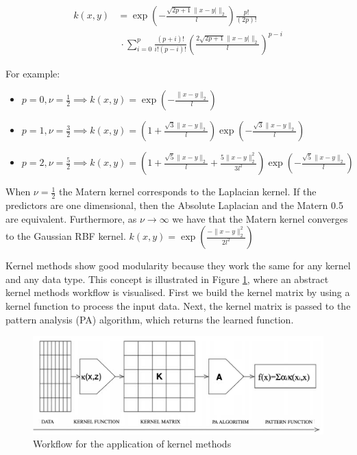 \begin{equation*}
    \begin{split}
    k(x,y)&=\exp \left(-{\frac {{\sqrt {2p+1}}\|x-y|\|_{2}}{l }}\right){\frac {p!}{(2p)!}}\\
    & \ \cdot \sum\limits_{i=0}^{p}{\frac {(p+i)!}{i!(p-i)!}}\left({\frac {2{\sqrt {2p+1}}\|x-y|\|_{2}}{l }}\right)^{p-i}
\end{split}
\end{equation*}

For example:
\begin{itemize}
    \item $p=0,\nu=\frac{1}{2} \implies k(x,y)=\exp\left(-\frac{\|x-y\|_{2}}{l}\right)$
    \item $p=1,\nu=\frac{3}{2} \implies 
    k(x,y)=\left(1+{\frac {{\sqrt {3}}\|x-y\|_{2}}{l }}\right)\exp \left(-{\frac {{\sqrt {3}}\|x-y\|_{2}}{l }}\right)$
    \item $p=2,\nu=\frac{5}{2} \implies k(x,y)=\left(1+{\frac {{\sqrt {5}}\|x-y\|_{2}}{l }}+{\frac {5\|x-y\|_{2}^{2}}{3 l ^{2}}}\right)\exp \left(-{\frac {{\sqrt {5}}\|x-y\|_{2}}{l }}\right)$
\end{itemize}

When $\nu=\frac{1}{2}$ the Matern kernel corresponds to the Laplacian kernel. If the predictors are one dimensional, then the Absolute Laplacian and the Matern 0.5 are equivalent. %
Furthermore, as $\nu \to \infty$ we have that the Matern kernel converges to the Gaussian RBF kernel.
$k(x,y)=\exp\left(\frac{-\|x-y\|_{2}^2}{2l^2}\right)$




Kernel methods show good modularity because they work the same for any kernel and any data type. This concept is illustrated in Figure \ref{fig:workflow_kernels}, where an abstract kernel methods workflow is visualised. First we build the kernel matrix by using a kernel function to process the input data. Next, the kernel matrix is passed to the pattern analysis (PA) algorithm, which returns the learned function.

\begin{figure}[!ht]
    \includegraphics[width=\textwidth]{images/workflow_kernels.png}
    \caption{Workflow for the application of kernel methods \cite{shawe2004kernel}}
    \label{fig:workflow_kernels}
\end{figure}